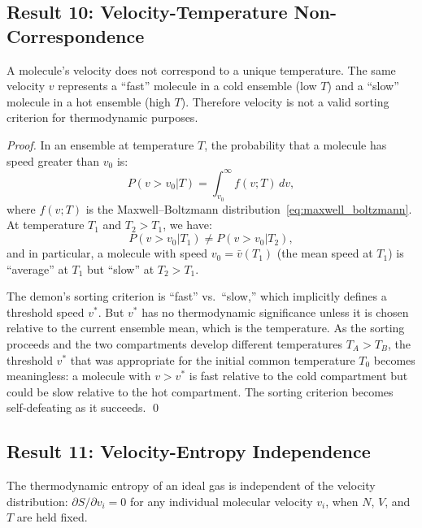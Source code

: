 \subsection{Result 10: Velocity-Temperature Non-Correspondence}

\begin{theorem}
\label{thm:v_temp_non_correspondence}
A molecule's velocity does not correspond to a unique temperature. The same
velocity $v$ represents a ``fast'' molecule in a cold ensemble (low $T$) and
a ``slow'' molecule in a hot ensemble (high $T$). Therefore velocity is not
a valid sorting criterion for thermodynamic purposes.
\end{theorem}

\begin{proof}
In an ensemble at temperature $T$, the probability that a molecule has speed
greater than $v_0$ is:
\begin{equation}
  P(v > v_0 | T) = \int_{v_0}^{\infty} f(v; T)\, dv,
  \label{eq:cumulative_mb}
\end{equation}
where $f(v; T)$ is the Maxwell--Boltzmann distribution~\eqref{eq:maxwell_boltzmann}.
At temperature $T_1$ and $T_2 > T_1$, we have:
\begin{equation}
  P(v > v_0 | T_1) \neq P(v > v_0 | T_2),
\end{equation}
and in particular, a molecule with speed $v_0 = \bar{v}(T_1)$ (the mean speed
at $T_1$) is ``average'' at $T_1$ but ``slow'' at $T_2 > T_1$.

The demon's sorting criterion is ``fast'' vs.\ ``slow,'' which implicitly
defines a threshold speed $v^*$. But $v^*$ has no thermodynamic significance
unless it is chosen relative to the current ensemble mean, which is the
temperature. As the sorting proceeds and the two compartments develop different
temperatures $T_A > T_B$, the threshold $v^*$ that was appropriate for the
initial common temperature $T_0$ becomes meaningless: a molecule with $v > v^*$
is fast relative to the cold compartment but could be slow relative to the hot
compartment. The sorting criterion becomes self-defeating as it succeeds. \qed
\end{proof}

\subsection{Result 11: Velocity-Entropy Independence}

\begin{theorem}
\label{thm:velocity_entropy_independence}
The thermodynamic entropy of an ideal gas is independent of the velocity
distribution: $\partial S / \partial v_i = 0$ for any individual molecular
velocity $v_i$, when $N$, $V$, and $T$ are held fixed.
\end{theorem}


